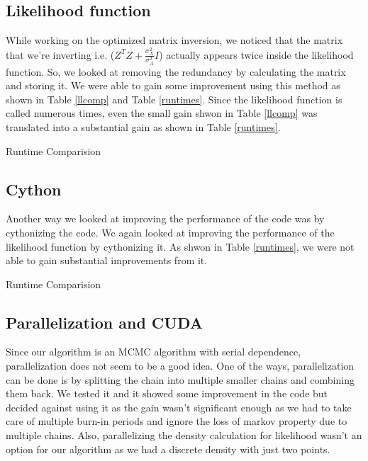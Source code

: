 \documentclass{article}
\begin{document}
\subsection{Likelihood function}
While working on the optimized matrix inversion, we noticed that the matrix that we're inverting i.e. ($Z^TZ+\frac{\sigma_X^2}{\sigma_A^2}I$) actually appears twice inside the likelihood function. So, we looked at removing the redundancy by calculating the matrix and storing it. We were able to gain some improvement using this method as shown in Table \ref{llcomp} and Table \ref{runtimes}. Since the likelihood function is called numerous times, even the small gain shwon in Table \ref{llcomp} was translated into a substantial gain as shown in Table \ref{runtimes}.\\


\begin{table}[ht]
\centering
\caption{Runtime Comparision \label{llcomp}}


\end{table}

\subsection{Cython}
Another way we looked at improving the performance of the code was by cythonizing the code. We again looked at improving the performance of the likelihood function by cythonizing it. As shwon in Table \ref{runtimes}, we were not able to gain substantial improvements from it.\\

\begin{table}[ht]
\centering
\caption{Runtime Comparision \label{runtimes}}

\end{table}

\subsection{Parallelization and CUDA}
Since our algorithm is an MCMC algorithm with serial dependence, parallelization does not seem to be a good idea. One of the ways, parallelization can be done is by splitting the chain into multiple smaller chains and combining them back. We tested it and it showed some improvement in the code but decided against using it as the gain wasn't significant enough as we had to take care of multiple burn-in periods and ignore the loss of markov property due to multiple chains. Also, parallelizing the density calculation for likelihood wasn't an option for our algorithm as we had a discrete density with just two points.
\end{document}
